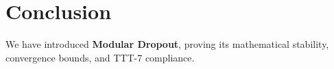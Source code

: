 \section{Conclusion}
We have introduced \textbf{Modular Dropout}, proving its mathematical stability, convergence bounds, and TTT-7 compliance.